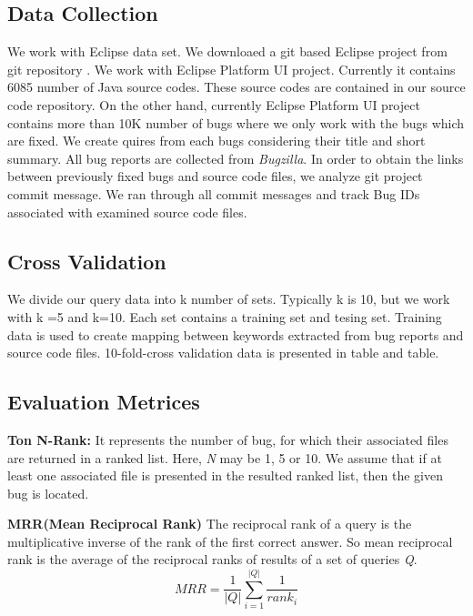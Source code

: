\documentclass{sig-alternate}
\begin{document}
\subsection{Data Collection}
We work with Eclipse data set. We downloaed a git based Eclipse project from git repository \cite{eclipseGit}. We work with Eclipse Platform UI project. Currently it contains 6085 number of Java source codes. These source codes are contained in our source code repository. On the other hand, currently Eclipse Platform UI project contains more than 10K number of bugs where we only work with the bugs which are fixed. We create quires from each bugs considering their title and short summary.
All bug reports are collected from \textit{Bugzilla}. In order to obtain the links between previously fixed bugs and source code files, we analyze git project commit message. We ran through all commit messages and track Bug IDs associated with examined source code files.

\subsection{Cross Validation}
We divide our query data into k number of sets. Typically k is 10, but we work with k =5 and k=10. Each set contains a training set and tesing set. Training data is used to create mapping between keywords extracted from bug reports and source code files. 10-fold-cross validation data is presented in table and table.

\subsection{Evaluation Metrices}
\textbf{Ton N-Rank:} It represents the number of bug, for which their associated files are returned in a ranked list. Here, \textit{N} may be 1, 5 or 10. We assume that if at least one associated file is presented in the resulted ranked list, then the given bug is located.

\textbf{MRR(Mean Reciprocal Rank)}
The reciprocal rank of a query is the multiplicative inverse of the rank of the first correct answer. So mean reciprocal rank is the average of the reciprocal ranks of results of a set of queries \textit{Q}.
\begin{equation}
MRR=\frac{1}{\left | Q \right |}\sum_{i=1}^{\left | Q \right |}\frac{1}{rank_{i}}
\end{equation}
\end{document}
